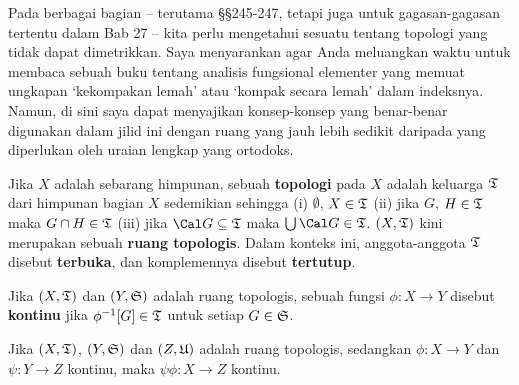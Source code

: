 
\def\varBbb#1{\mathchoice{\hbox{$\Bbb#1$\hskip0.02em}}
  {\hbox{$\Bbb#1$\hskip0.02em}}
  {\hbox{$\scriptstyle\Bbb#1$\hskip0.04em}}
  {\hbox{$\scriptscriptstyle\Bbb#1$\hskip0.04em}}}

\def\chaptername{Lampiran}
\def\sectionname{Topologi umum}


Pada berbagai bagian -- terutama \S\S245-247, %
tetapi juga untuk gagasan-gagasan tertentu dalam Bab 27 -- kita perlu
mengetahui sesuatu tentang topologi yang tidak dapat dimetrikkan. Saya
menyarankan agar Anda meluangkan waktu untuk membaca sebuah buku
tentang analisis fungsional elementer yang memuat ungkapan `kekompakan lemah'
atau `kompak secara lemah' dalam indeksnya. Namun, di sini saya dapat
menyajikan konsep-konsep yang benar-benar digunakan dalam jilid ini dengan
ruang yang jauh lebih sedikit daripada yang diperlukan oleh uraian lengkap
yang ortodoks.

  Jika $X$ adalah sebarang himpunan,
sebuah {\bf topologi} pada $X$ adalah keluarga $\frak T$ dari himpunan bagian
$X$ sedemikian sehingga (i) $\emptyset$, $X\in\frak T$ (ii) jika $G$,
$H\in\frak T$ maka $G\cap H\in\frak T$ (iii) jika
$\Cal G\subseteq\frak T$ maka $\bigcup\Cal G\in\frak T$.  $(X,\frak T)$ kini merupakan sebuah
{\bf ruang topologis}. Dalam konteks ini, anggota-anggota $\frak T$ disebut
{\bf terbuka}, dan komplemennya disebut
{\bf tertutup}.

 Jika $(X,\frak T)$ dan $(Y,\frak
S)$ adalah ruang topologis, sebuah fungsi $\phi:X\to Y$ disebut
{\bf kontinu} jika $\phi^{-1}[G]\in\frak T$ untuk setiap
$G\in\frak S$. 

 Jika $(X,\frak T)$, $(Y,\frak S)$ dan
$(Z,\frak U)$ adalah ruang topologis, sedangkan $\phi:X\to Y$ dan
$\psi:Y\to Z$ kontinu, maka $\psi\phi:X\to Z$ kontinu.

